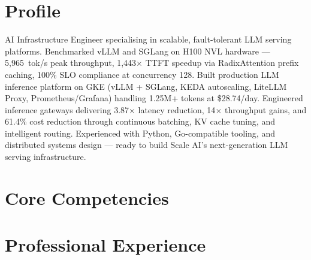 \documentclass[11pt,a4paper]{moderncv}
\begin{document}
\makecvtitle

\section{Profile}
AI Infrastructure Engineer specialising in scalable, fault-tolerant LLM serving platforms. Benchmarked vLLM and SGLang on H100 NVL hardware — 5,965~tok/s peak throughput, 1,443$\times$ TTFT speedup via RadixAttention prefix caching, 100\% SLO compliance at concurrency 128. Built production LLM inference platform on GKE (vLLM + SGLang, KEDA autoscaling, LiteLLM Proxy, Prometheus/Grafana) handling 1.25M+ tokens at \$28.74/day. Engineered inference gateways delivering 3.87$\times$ latency reduction, 14$\times$ throughput gains, and 61.4\% cost reduction through continuous batching, KV cache tuning, and intelligent routing. Experienced with Python, Go-compatible tooling, and distributed systems design — ready to build Scale AI's next-generation LLM serving infrastructure.

\section{Core Competencies}

\section{Professional Experience}
\end{document}
